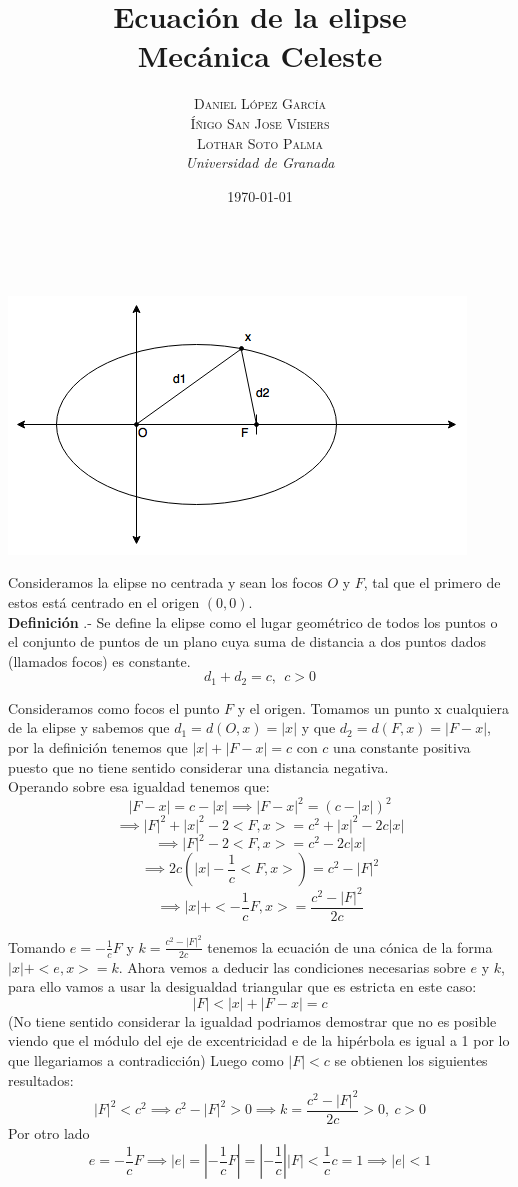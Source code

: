 \documentclass[a4paper, 11pt]{article} %
\title{\textbf{Ecuación de la elipse}\\ %
\vspace{20 pt}
Mecánica Celeste} %
\author{\textsc{Daniel López García\\
Íñigo San Jose Visiers\\
Lothar Soto Palma} %
\\{\textit{Universidad de Granada}}} %
\date{\today} %
\makeatletter
\renewcommand{\maketitle}{ %
\begin{center} %
{\Huge\@title} %
\end{center}

\vspace{20pt} %

\begin{flushright} %
{\large\@author} %
\\\@date %

\vspace{40pt} %
\end{flushright}
\renewcommand{\baselinestretch}{0.5}

}
\newcounter{ndef}
\makeatother
\begin{document}
	\maketitle
	\begin{center}
		\includegraphics[scale=0.75]{elipse.png} 
	\end{center}	\addtocounter{ndef}{1}
	Consideramos la elipse no centrada y sean los focos $O$ y $F$, tal que el primero de estos está centrado en el origen $(0,0)$.\\ 
	\textbf{Definición }.- Se define la elipse como el lugar geométrico de todos los puntos o el conjunto de puntos de un plano cuya suma de distancia a dos puntos dados (llamados focos) es constante.\\
	$$d_1+d_2 = c, \ \ c>0$$
		
	Consideramos como focos el punto $F$ y el origen. Tomamos un punto x cualquiera de la elipse y sabemos que $d_1 = d(O,x) = |x|$ y que $d_2 = d(F,x) = |F-x|$, por la definición tenemos que $|x|+|F-x|=c$ con $c$ una constante positiva puesto que no tiene sentido considerar una distancia negativa.\\
	Operando sobre esa igualdad tenemos que:\\
	$$|F-x|= c - |x| \implies {|F-x|}^2 = {(c-|x|)}^2 $$ 
	$$\implies  |F|^2+|x|^2-2<F,x> = c^2+|x|^2-2c|x| $$
	$$\implies |F|^2-2<F,x>= c^2 -2c|x| $$
	$$\implies 2c(|x|-\frac{1}{c}<F,x>)= c^2 - |F|^2$$
	$$\implies |x|+<-\frac{1}{c}F,x> = \frac{c^2-|F|^2}{2c}$$
	
	Tomando $e = -\frac{1}{c}F $ y $k = \frac{c^2-|F|^2}{2c}$ tenemos la ecuación de una cónica de la forma $|x|+<e,x>=k$.
	Ahora vemos a deducir las condiciones necesarias sobre $e$ y $k$,
	para ello vamos a usar la desigualdad triangular que es estricta en este caso: \\
	$$|F| < |x| + |F-x| = c $$
	(No tiene sentido considerar la igualdad podriamos demostrar que no es posible viendo que el módulo del eje de excentricidad e de la hipérbola es igual a 1 por lo que llegariamos a contradicción)
	Luego como $|F| < c$ se obtienen los siguientes resultados:
	$$|F|^2 < c^2 \implies c^2-|F|^2>0 \implies k = \frac{c^2-|F|^2}{2c} > 0, \ c>0$$ 
	Por otro lado 
	$$e = -\frac{1}{c}F \implies |e| = |-\frac{1}{c}F| = |-\frac{1}{c}||F| < \frac{1}{c}c = 1 \implies |e|<1$$
	
\end{document}
